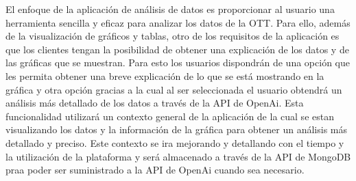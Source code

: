 El enfoque de la aplicación de análisis de datos es proporcionar al usuario una herramienta sencilla y eficaz para analizar los datos
de la OTT. Para ello, además de la visualización de gráficos y tablas, otro de los requisitos de la aplicación es que los clientes
tengan la posibilidad de obtener una explicación de los datos y de las gráficas que se muestran. Para esto los usuarios dispondrán de 
una opción que les permita obtener una breve explicación de lo que se está mostrando en la gráfica y otra opción gracias a la cual 
al ser seleccionada el usuario obtendrá un análisis más detallado de los datos a través de la API de OpenAi. Esta funcionalidad utilizará
un contexto general de la aplicación de la cual se estan visualizando los datos y la información de la gráfica para obtener un análisis
más detallado y preciso. Este contexto se ira mejorando y detallando con el tiempo y la utilización de la plataforma y será almacenado
a través de la API de MongoDB praa poder ser suministrado a la API de OpenAi cuando sea necesario. 





